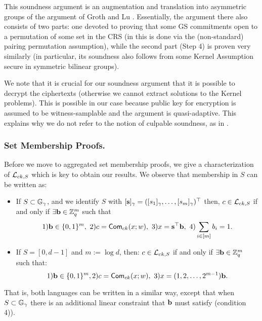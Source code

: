 This soundness argument is an augmentation and translation into asymmetric groups of the argument of Groth and Lu \cite{AC:GroLu07}. Essentially, the argument there also consists of two parts: one devoted to proving that some GS commitments open to a permutation of some set in the CRS (in \cite{AC:GroLu07} this is done via the (non-standard) pairing permutation assumption), while the second part (Step 4) is proven very similarly (in particular, its soundness also follows from some Kernel Assumption secure in symmetric bilinear groups). 

We note that it is crucial for our soundness argument that it is possible to decrypt the ciphertexts (otherwise we cannot extract solutions to the Kernel problems). This is possible in our case because public key for encryption is assumed to be witness-samplable and the argument is quasi-adaptive. This explains why we do not refer to the notion of culpable soundness, as in \cite{AC:GroLu07,EPRINT:FauLip15}.


\subsubsection{Set Membership Proofs.} Before we move to aggregated set membership proofs, we give a characterization of $\mathcal{L}_{ck,S}$ which is key to obtain our results. We observe that membership in $S$ can be written as:
\begin{itemize}
\item If $S \subset \mathbb{G}_{\gamma}$, and we identify $S$ with $[\mathbf{s}]_\gamma=([s_1]_\gamma,\ldots,[s_m]_\gamma)^\top$ then, 
$c \in \mathcal{L}_{ck,S}$ if and only if $\exists \mathbf{b} \in \mathbb{Z}_q^{m}$ such that
\vspace{-0.3cm}
$$ 1) \mathbf{b} \in \{0,1\}^{m}, \ 2) c=\mathsf{Com}_{ck}(x;w), \ 3) x=\mathbf{s}^{\top} \mathbf{b}, \ 4) \sum_{i \in [m]} b_i=1.$$
\vspace{-0.3cm}
\item If $S=[0,d-1]$ and $m:=\log d$, then: 
$c \in \mathcal{L}_{ck,S}$ if and only if $\exists \mathbf{b} \in \mathbb{Z}_q^{m}$ such that:   
\vspace{-0.3cm}
$$ 1) \mathbf{b} \in \{0,1\}^{m}, 2) c=\mathsf{Com}_{ck}(x;w), \ 3) x=(1,2,\ldots,2^{m-1}) \mathbf{b} .$$
\end{itemize} 
\vspace{-0.2cm}
That is, both languages can be written in a similar way, except that when $S \subset \mathbb{G}_{\gamma}$ there is an additional linear constraint that $\mathbf{b}$ must satisfy (condition 4)). 

